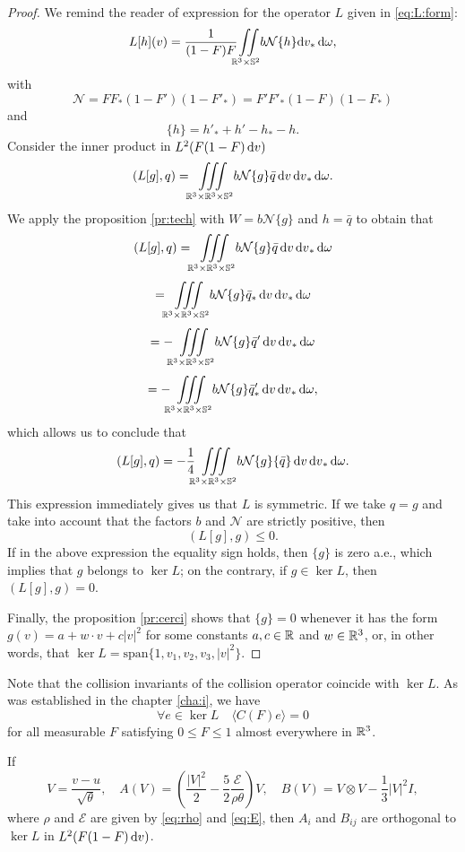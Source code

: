 \begin{proof}
We remind the reader of expression for the operator $L$ given in  \eqref{eq:L:form}:\[
L[h](v)=\frac{1}{ (1-F)F }{\iint\limits_{\mathbb R^3\times\mathbb S^2}} b\mathcal N \{h \}\mathrm dv_\ast{\,\mathrm{d} \omega}, \]
with\[\mathcal N = FF_\ast(1-F')(1-F'_\ast)=F'F'_\ast(1-F)(1-F_\ast)\]
and\[\{h\}=h'_\ast+h'-h_\ast-h.\]
Consider the inner product in $L^2(F(1-F){\,\mathrm{d} v})$ \[(L[g],q)={\iiint\limits_{\mathbb R^3\times\mathbb R^3\times\mathbb S^2}} b\mathcal N \{g \}\bar q{\,\mathrm{d} v}{\,\mathrm{d} v}_\ast{\,\mathrm{d} \omega}.\]
We apply the proposition \ref{pr:tech} with $W= b\mathcal N \{g \}$ and $h=\bar q$ to obtain that
\[(L[g],q) =  {\iiint\limits_{\mathbb R^3\times\mathbb R^3\times\mathbb S^2}} b\mathcal N \{g \}\bar q{\,\mathrm{d} v}{\,\mathrm{d} v}_\ast{\,\mathrm{d} \omega}\]
\[={\iiint\limits_{\mathbb R^3\times\mathbb R^3\times\mathbb S^2}} b\mathcal N \{g \}\bar q_\ast{\,\mathrm{d} v}{\,\mathrm{d} v}_\ast{\,\mathrm{d} \omega}\]
\[=-{\iiint\limits_{\mathbb R^3\times\mathbb R^3\times\mathbb S^2}} b\mathcal N \{g \}\bar q'{\,\mathrm{d} v}{\,\mathrm{d} v}_\ast{\,\mathrm{d} \omega}\]
\[=-{\iiint\limits_{\mathbb R^3\times\mathbb R^3\times\mathbb S^2}} b\mathcal N \{g \}\bar q'_\ast{\,\mathrm{d} v}{\,\mathrm{d} v}_\ast{\,\mathrm{d} \omega},\]
which allows us to conclude that
\[(L[g],q) =  -\frac 14 {\iiint\limits_{\mathbb R^3\times\mathbb R^3\times\mathbb S^2}} b\mathcal N \{g \}\{\bar q\}{\,\mathrm{d} v}{\,\mathrm{d} v}_\ast{\,\mathrm{d} \omega}.\]
This expression immediately gives us that $L$ is symmetric. If we take $q=g$ and take into account that the factors $b$ and $\mathcal N$ are strictly positive, then \[(L[g],g)\le 0.\]
If in the above expression the equality sign holds, then $\{g\}$ is zero a.e., which implies that $g$ belongs to $\ker L$; on the contrary, if $g\in\ker L$, then $(L[g],g)=0$.

Finally, the proposition \ref{pr:cerci} shows that $\{g\}=0$ whenever it has the form $g(v)=a+w\cdot v+c|v|^2$ for some constants $a,c\in {\mathbb {R}}$ and $w\in {\mathbb {R}^3}$, or, in other words, that $\ker L = \mbox{span}\{1,v_1,v_2,v_3,|v|^2\}$.
\end{proof}
Note that the collision invariants of the collision operator coincide with $\ker L$. As was established in the chapter \ref{cha:i}, we have \[\forall   e\in \ker L\quad \langle C(F)  e\rangle=0 \]for all measurable $F$ satisfying $0\le F\le 1$ almost everywhere in ${\mathbb {R}^3}$.

\begin{theorem}\label{th:ortho}
If \[V=\frac{v-u}{\sqrt\theta}, \quad A(V)=\left(\frac{|V|^2}{2}-\frac52   \frac{\mathcal E}{\rho\theta}\right)V,\quad B(V)=V\otimes V-\frac 13 |V|^2I,\]
where $\rho$ and $\mathcal E$ are given by \eqref{eq:rho} and \eqref{eq:E}, then $A_i$ and
$B_{ij}$   are orthogonal to $\ker L$ in $L^2(F(1-F) {\,\mathrm{d} v})$.
\end{theorem}

